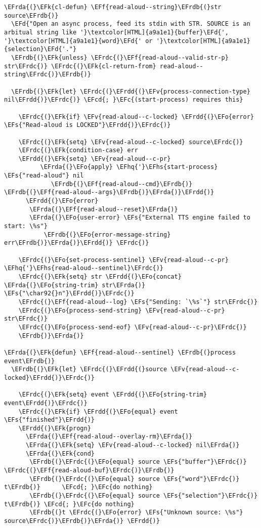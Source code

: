 \documentclass[a4wide,10pt]{article}
\newcommand{\EFc}[1]{\textcolor{EFc}{#1}} %
\newcommand{\EFcd}[1]{\textcolor{EFcd}{#1}} %
\newcommand{\EFs}[1]{\textcolor{EFs}{#1}} %
\newcommand{\EFd}[1]{\textcolor{EFd}{#1}} %
\newcommand{\EFk}[1]{\textcolor{EFk}{#1}} %
\newcommand{\EFf}[1]{\textcolor{EFf}{#1}} %
\newcommand{\EFv}[1]{\textcolor{EFv}{#1}} %
\newcommand{\EFo}[1]{\textcolor{EFo}{#1}} %
\newcommand{\EFhq}[1]{\textcolor{EFhq}{#1}} %
\newcommand{\EFhs}[1]{\textcolor{EFhs}{#1}} %
\newcommand{\EFrda}[1]{\textcolor{EFrda}{#1}} %
\newcommand{\EFrdb}[1]{\textcolor{EFrdb}{#1}} %
\newcommand{\EFrdc}[1]{\textcolor{EFrdc}{#1}} %
\newcommand{\EFrdd}[1]{\textcolor{EFrdd}{#1}} %
\begin{document}
\begin{Code}
\begin{Verbatim}
\EFrda{(}\EFk{cl-defun} \EFf{read-aloud--string}\EFrdb{(}str source\EFrdb{)}
  \EFd{"Open an async process, feed its stdin with STR. SOURCE is an
arbitual string like '}\textcolor[HTML]{a9a1e1}{buffer}\EFd{', '}\textcolor[HTML]{a9a1e1}{word}\EFd{' or '}\textcolor[HTML]{a9a1e1}{selection}\EFd{'."}
  \EFrdb{(}\EFk{unless} \EFrdc{(}\EFf{read-aloud--valid-str-p} str\EFrdc{)} \EFrdc{(}\EFk{cl-return-from} read-aloud--string\EFrdc{)}\EFrdb{)}

  \EFrdb{(}\EFk{let} \EFrdc{(}\EFrdd{(}\EFv{process-connection-type} nil\EFrdd{)}\EFrdc{)} \EFcd{; }\EFc{(start-process) requires this}

    \EFrdc{(}\EFk{if} \EFv{read-aloud--c-locked} \EFrdd{(}\EFo{error} \EFs{"Read-aloud is LOCKED"}\EFrdd{)}\EFrdc{)}

    \EFrdc{(}\EFk{setq} \EFv{read-aloud--c-locked} source\EFrdc{)}
    \EFrdc{(}\EFk{condition-case} err
	\EFrdd{(}\EFk{setq} \EFv{read-aloud--c-pr}
	      \EFrda{(}\EFo{apply} \EFhq{'}\EFhs{start-process} \EFs{"read-aloud"} nil
		     \EFrdb{(}\EFf{read-aloud--cmd}\EFrdb{)} \EFrdb{(}\EFf{read-aloud--args}\EFrdb{)}\EFrda{)}\EFrdd{)}
      \EFrdd{(}\EFo{error}
       \EFrda{(}\EFf{read-aloud--reset}\EFrda{)}
       \EFrda{(}\EFo{user-error} \EFs{"External TTS engine failed to start: \%s"}
		   \EFrdb{(}\EFo{error-message-string} err\EFrdb{)}\EFrda{)}\EFrdd{)} \EFrdc{)}

    \EFrdc{(}\EFo{set-process-sentinel} \EFv{read-aloud--c-pr} \EFhq{'}\EFhs{read-aloud--sentinel}\EFrdc{)}
    \EFrdc{(}\EFk{setq} str \EFrdd{(}\EFo{concat} \EFrda{(}\EFo{string-trim} str\EFrda{)} \EFs{"\char92{}n"}\EFrdd{)}\EFrdc{)}
    \EFrdc{(}\EFf{read-aloud--log} \EFs{"Sending: `\%s`"} str\EFrdc{)}
    \EFrdc{(}\EFo{process-send-string} \EFv{read-aloud--c-pr} str\EFrdc{)}
    \EFrdc{(}\EFo{process-send-eof} \EFv{read-aloud--c-pr}\EFrdc{)}
    \EFrdb{)}\EFrda{)}

\EFrda{(}\EFk{defun} \EFf{read-aloud--sentinel} \EFrdb{(}process event\EFrdb{)}
  \EFrdb{(}\EFk{let} \EFrdc{(}\EFrdd{(}source \EFv{read-aloud--c-locked}\EFrdd{)}\EFrdc{)}

    \EFrdc{(}\EFk{setq} event \EFrdd{(}\EFo{string-trim} event\EFrdd{)}\EFrdc{)}
    \EFrdc{(}\EFk{if} \EFrdd{(}\EFo{equal} event \EFs{"finished"}\EFrdd{)}
	\EFrdd{(}\EFk{progn}
	  \EFrda{(}\EFf{read-aloud--overlay-rm}\EFrda{)}
	  \EFrda{(}\EFk{setq} \EFv{read-aloud--c-locked} nil\EFrda{)}
	  \EFrda{(}\EFk{cond}
	   \EFrdb{(}\EFrdc{(}\EFo{equal} source \EFs{"buffer"}\EFrdc{)} \EFrdc{(}\EFf{read-aloud-buf}\EFrdc{)}\EFrdb{)}
	   \EFrdb{(}\EFrdc{(}\EFo{equal} source \EFs{"word"}\EFrdc{)} t\EFrdb{)}	  \EFcd{; }\EFc{do nothing}
	   \EFrdb{(}\EFrdc{(}\EFo{equal} source \EFs{"selection"}\EFrdc{)} t\EFrdb{)} \EFcd{; }\EFc{do nothing}
	   \EFrdb{(}t \EFrdc{(}\EFo{error} \EFs{"Unknown source: \%s"} source\EFrdc{)}\EFrdb{)}\EFrda{)} \EFrdd{)}


\end{Verbatim}
\end{Code}
\end{document}
